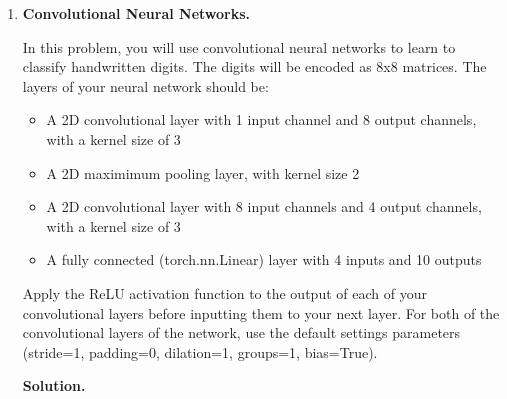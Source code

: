 \documentclass{article}
\theoremstyle{definition}
\theoremstyle{remark}
\newenvironment{Q}
        {%
            \clearpage
        \item
            }
        {%
            \phantom{s}
          \bigskip
          \textbf{Solution.}
        }
\begin{document}
\begin{enumerate}
                \begin{Q}
                    \textbf{Convolutional Neural Networks.}

                    In this problem, you will use convolutional neural networks
                    to learn to classify handwritten digits.  The digits will
                    be encoded as 8x8 matrices.  The layers of your neural
                    network should be:
                    \begin{itemize}
                        \item A 2D convolutional layer with 1 input channel and 8 output channels, with a kernel size of 3
                        \item A 2D maximimum pooling layer, with kernel size 2
                        \item A 2D convolutional layer with 8 input channels and 4 output channels, with a kernel size of 3
                        \item A fully connected (torch.nn.Linear) layer with 4 inputs and 10 outputs
                    \end{itemize}
                    Apply the ReLU activation function to the output
                    of each of your convolutional layers before inputting them
                    to your next layer.  For both of the convolutional layers
                    of the network, use the default settings parameters
                    (stride=1, padding=0, dilation=1, groups=1, bias=True).


\end{Q}
\end{enumerate}
\end{document}
